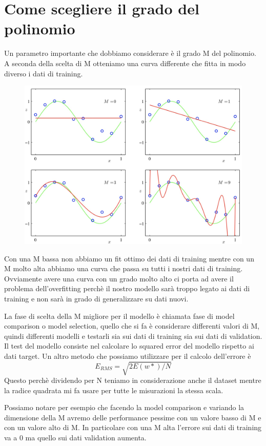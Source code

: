 \documentclass[14pt]{extreport}
\begin{document}
\section{Come scegliere il grado del polinomio}

Un parametro importante che dobbiamo considerare è il grado M del polinomio. A seconda della scelta di M otteniamo una curva differente che fitta in
modo diverso i dati di training.

\begin{figure}[H]
	\centering
	\includegraphics[width=0.7\linewidth]{83.jpeg}
\end{figure}

Con una M bassa non abbiamo un fit ottimo dei dati di training mentre con un M molto alta abbiamo una curva che passa su tutti i nostri dati di
training. Ovviamente avere una curva con un grado molto alto ci porta ad avere il problema dell'overfitting perchè il nostro modello sarà troppo
legato ai dati di training e non sarà in grado di generalizzare su dati nuovi.

La fase di scelta della M migliore per il modello è chiamata fase di model comparison o model selection, quello che si fa è considerare differenti
valori di M, quindi differenti modelli e testarli sia sui dati di training sia sui dati di validation. Il test del modello consiste nel calcolare lo
squared error del modello rispetto ai dati target. Un altro metodo che possiamo utilizzare per il calcolo dell'errore è $$E_{RMS} = \sqrt{2E(w*)/N}$$
Questo perchè dividendo per N teniamo in considerazione anche il dataset mentre la radice quadrata mi fa usare per tutte le misurazioni la stessa
scala.

Possiamo notare per esempio che facendo la model comparison e variando la dimensione della M avremo delle performance pessime con un valore basso di M
e con un valore alto di M. In particolare con una M alta l'errore sui dati di training va a 0 ma quello sui dati validation aumenta.
\end{document}
